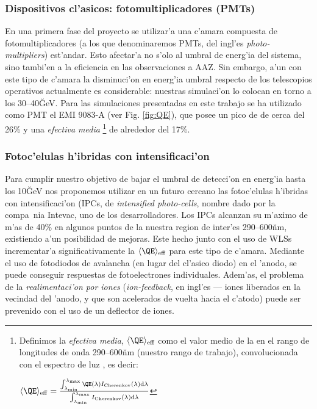 \subsubsection{Dispositivos cl'asicos: fotomultiplicadores (PMTs)}
%
En una primera fase del proyecto se utilizar'a una c'amara compuesta
de fotomultiplicadores (a los que denominaremos PMTs, del ingl'es
\emph{photo-multipliers}) est'andar. Esto afectar'a no s'olo al umbral
de energ'ia del sistema, sino tambi'en a la eficiencia en las
observaciones a AAZ. Sin embargo, a'un con este tipo de c'amara la
disminuci'on en energ'ia umbral respecto de los telescopios operativos
actualmente es considerable: nuestras simulaci'on lo colocan en torno
a los 30--40\u{GeV}. Para las simulaciones presentadas en este trabajo
se ha utilizado como PMT el EMI 9083-A (ver Fig. \ref{fig:QE}), que
posee un pico de \QE de cerca del 26\% y una \emph{\QE efectiva
media}%
\footnote{Definimos la \emph{\QE efectiva media}, 
$\langle\QE\rangle_\mathrm{eff}$ como el valor medio de la \QE en el
rango de longitudes de onda 290--600\u{nm} (nuestro rango de trabajo),
convolucionada con el espectro de luz \Cherenkov, es decir:\\
\centerline{$ \langle\QE\rangle_\mathrm{eff} = 
\frac{\int_{\lambda_\mathrm{min}}^{\lambda_\mathrm{max}} \QE(\lambda)
I_\mathrm{Cherenkov} (\lambda) \mathrm{d}\lambda }%
{\int_{\lambda_\mathrm{min}}^{\lambda_\mathrm{max}}
I_\mathrm{Cherenkov} (\lambda) \mathrm{d}\lambda} $} } de alrededor del
17\%. %

\subsubsection{Fotoc'elulas h'ibridas con intensificaci'on}
%
Para cumplir nuestro objetivo de bajar el umbral de detecci'on en
energ'ia hasta los 10\u{GeV} nos proponemos utilizar en un futuro
cercano las fotoc'elulas h'ibridas con intensificaci'on (IPCs, de
\emph{intensified photo-cells}, nombre dado por la compa~nia Intevac,
uno de los desarrolladores.  Los IPCs alcanzan su m'aximo de m'as de
40\% \QE en algunos puntos de la nuestra region de inter'es
290--600\u{nm}, existiendo a'un posibilidad de mejoras. Este hecho
junto con el uso de WLSs incrementar'a significativamente la
$\langle\QE\rangle_\mathrm{eff}$ para este tipo de c'amara.  Mediante
el uso de fotodiodos de avalancha (en lugar del cl'asico diodo) en el
'anodo, se puede conseguir respuestas de fotoelectrones individuales.
Adem'as, el problema de la \emph{realimentaci'on por iones}
(\emph{ion-feedback}, en ingl'es --- iones liberados en la vecindad
del 'anodo, y que son acelerados de vuelta hacia el c'atodo) puede ser
prevenido con el uso de un deflector de iones.

